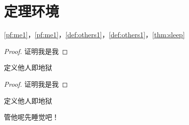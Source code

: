 \section{定理环境}

\cref{pf:me1}，\cref{pf:me1}，\cref{def:others1}，\cref{def:others1}，\cref{thm:sleep}

\begin{proof}\label{pf:me1}
    证明我是我
\end{proof}

\begin{definition}[他人]\label{def:others1}
    定义他人即地狱
\end{definition}

\begin{proof}\label{pf:me2}
    证明我是我
\end{proof}

\begin{definition}[他人]\label{def:others2}
    定义他人即地狱
\end{definition}

\begin{theorem}[睡觉]\label{thm:sleep}
    管他呢先睡觉吧！
\end{theorem}
